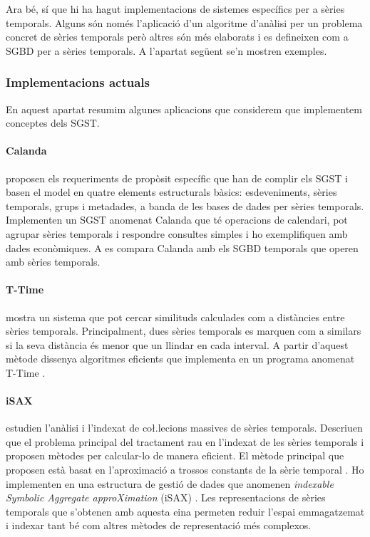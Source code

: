 Ara bé, sí que hi ha hagut implementacions de sistemes específics per a sèries temporals. Alguns són només l'aplicació d'un algoritme d'anàlisi per un problema concret de sèries temporals però  altres  són més elaborats i es defineixen com a SGBD per a sèries temporals. A l'apartat següent se'n mostren exemples. 




\subsubsection{Implementacions actuals}

En aquest apartat resumim algunes aplicacions que considerem que implementem conceptes dels SGST.


\paragraph{Calanda} \textcite{dreyer94} proposen els requeriments de propòsit específic que han de complir els SGST i basen el model en quatre elements estructurals bàsics: esdeveniments, sèries temporals, grups i metadades, a banda de les bases de dades per sèries temporals. Implementen un SGST anomenat Calanda \parencite{dreyer94b,dreyer95,dreyer95b} que té operacions de calendari, pot agrupar sèries temporals i respondre consultes simples i ho exemplifiquen amb dades econòmiques. A \cite{schmidt95} es compara Calanda amb els SGBD temporals que operen amb sèries temporals. 




\paragraph{T-Time}  \textcite{assfalg08:thesis} mostra un sistema que pot cercar similituds calculades com a distàncies entre sèries temporals. Principalment, dues sèries temporals es marquen com a similars si la seva distància és menor que un llindar en cada interval. A partir d'aquest mètode dissenya algoritmes eficients que implementa en un programa anomenat T-Time \parencite{assfalg08:ttime}.


 
\paragraph{iSAX} \textcite{keogh08:isax,keogh10:isax} estudien l'anàlisi i l'indexat de co\l.lecions massives de sèries temporals. Descriuen que el problema principal del tractament rau en l'indexat de les sèries temporals i proposen mètodes per calcular-lo de manera eficient. El mètode principal que proposen està basat en l'aproximació a trossos constants de la sèrie temporal \parencite{keogh00}.  Ho implementen en una estructura de gestió de dades que anomenen \emph{indexable Symbolic Aggregate approXimation} (iSAX) \parencite{isax}. Les representacions de sèries temporals que s'obtenen amb aquesta eina permeten reduir l'espai emmagatzemat i indexar tant bé com altres mètodes de representació més complexos.




